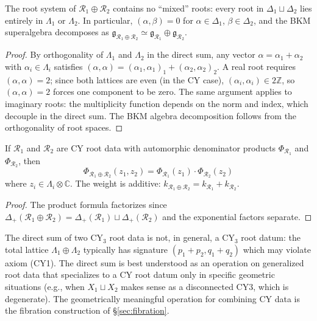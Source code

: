 \begin{lemma}
\label{lem:direct-sum-roots}

The root system of $\mathcal{R}_1 \oplus \mathcal{R}_2$ contains no ``mixed'' roots: every root in $\Delta_1 \sqcup \Delta_2$ lies entirely in $\Lambda_1$ or $\Lambda_2$. In particular, $(\alpha, \beta) = 0$ for $\alpha \in \Delta_1$, $\beta \in \Delta_2$, and the BKM superalgebra decomposes as $\mathfrak{g}_{\mathcal{R}_1 \oplus \mathcal{R}_2} \simeq \mathfrak{g}_{\mathcal{R}_1} \oplus \mathfrak{g}_{\mathcal{R}_2}$.
\end{lemma}

\begin{proof}
By orthogonality of $\Lambda_1$ and $\Lambda_2$ in the direct sum, any vector $\alpha = \alpha_1 + \alpha_2$ with $\alpha_i \in \Lambda_i$ satisfies $(\alpha, \alpha) = (\alpha_1, \alpha_1)_1 + (\alpha_2, \alpha_2)_2$. A real root requires $(\alpha, \alpha) = 2$; since both lattices are even (in the CY case), $(\alpha_i, \alpha_i) \in 2\mathbb{Z}$, so $(\alpha, \alpha) = 2$ forces one component to be zero. The same argument applies to imaginary roots: the multiplicity function depends on the norm and index, which decouple in the direct sum. The BKM algebra decomposition follows from the orthogonality of root spaces.
\end{proof}

\begin{proposition}
\label{prop:direct-sum-automorphic}

If $\mathcal{R}_1$ and $\mathcal{R}_2$ are CY root data with automorphic denominator products $\Phi_{\mathcal{R}_1}$ and $\Phi_{\mathcal{R}_2}$, then
\[
 \Phi_{\mathcal{R}_1 \oplus \mathcal{R}_2}(z_1, z_2) = \Phi_{\mathcal{R}_1}(z_1) \cdot \Phi_{\mathcal{R}_2}(z_2)
\]
where $z_i \in \Lambda_i \otimes \mathbb{C}$. The weight is additive: $k_{\mathcal{R}_1 \oplus \mathcal{R}_2} = k_{\mathcal{R}_1} + k_{\mathcal{R}_2}$.
\end{proposition}

\begin{proof}
The product formula factorizes since $\Delta_+(\mathcal{R}_1 \oplus \mathcal{R}_2) = \Delta_+(\mathcal{R}_1) \sqcup \Delta_+(\mathcal{R}_2)$ and the exponential factors separate.
\end{proof}

\begin{warning}
\label{warn:direct-sum-not-cy}
The direct sum of two CY$_3$ root data is not, in general, a CY$_3$ root datum: the total lattice $\Lambda_1 \oplus \Lambda_2$ typically has signature $(p_1 + p_2, q_1 + q_2)$ which may violate axiom (CY1). The direct sum is best understood as an operation on generalized root data that specializes to a CY root datum only in specific geometric situations (e.g., when $X_1 \sqcup X_2$ makes sense as a disconnected CY3, which is degenerate). The geometrically meaningful operation for combining CY data is the fibration construction of \S\ref{sec:fibration}.
\end{warning}


